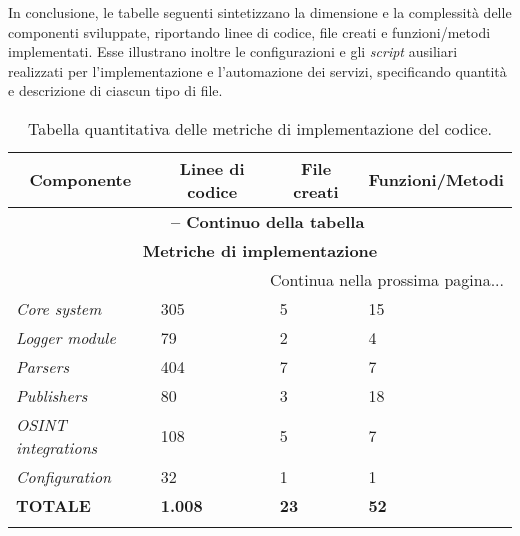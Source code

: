 In conclusione, le tabelle seguenti sintetizzano la dimensione e la complessità delle componenti sviluppate, riportando linee di codice, file creati e funzioni/metodi implementati. Esse illustrano inoltre le configurazioni e gli \textit{script} ausiliari realizzati per l'implementazione e l'automazione dei servizi, specificando quantità e descrizione di ciascun tipo di file.
\begin{center}
\begin{longtable}{|p{}|p{}|p{}|p{}|}
\hline
\multicolumn{1}{|c|}{\textbf{Componente}} & 
\multicolumn{1}{c|}{\textbf{Linee di codice}} & 
\multicolumn{1}{c|}{\textbf{File creati}} & 
\multicolumn{1}{c|}{\textbf{Funzioni/Metodi}} \\ 
\hline
\endfirsthead

\multicolumn{4}{c}{{\bfseries \tablename\ \thetable{} -- Continuo della tabella}}\\
\hline
\multicolumn{4}{|c|}{\textbf{Metriche di implementazione}} \\ \hline
\endhead

\hline \multicolumn{4}{|r|}{{Continua nella prossima pagina...}} \\ \hline
\endfoot

\endlastfoot

\textit{Core system} & 305 & 5 & 15 \\ \hline
\textit{Logger module} & 79 & 2 & 4 \\ \hline
\textit{Parsers} & 404 & 7 & 7 \\ \hline
\textit{Publishers} & 80 & 3 & 18 \\ \hline
\textit{OSINT integrations} & 108 & 5 & 7 \\ \hline
\textit{Configuration} & 32 & 1 & 1 \\ \hline
\textbf{TOTALE} & \textbf{1.008} & \textbf{23} & \textbf{52} \\ \hline

\caption{Tabella quantitativa delle metriche di implementazione del codice.}
\label{tab:metriche-codice}
\end{longtable}
\end{center}

